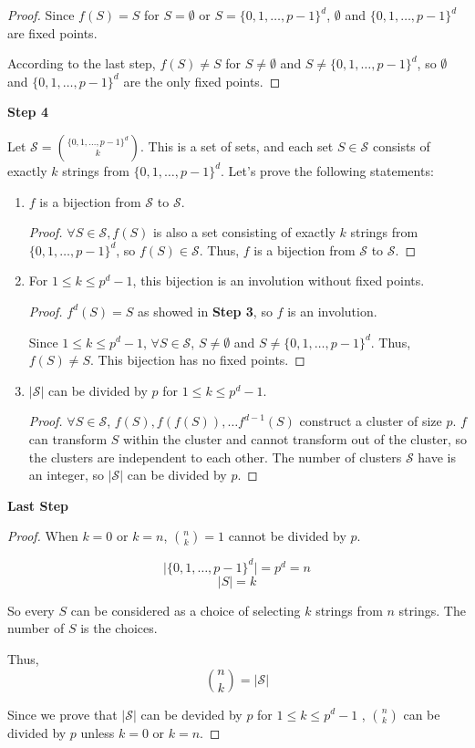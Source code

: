 \begin{solution}
\begin{proof}
Since $f(S) = S$ for $S = \emptyset$ or $S = \{0,1, \dots, p-1\}^d$, $\emptyset$ and $\{0,1, \dots, p-1\}^d$ are fixed points.

According to the last step, $f(S) \neq S$ for $S \neq \emptyset$ and $S \neq \{0,1, \dots, p-1 \}^d$, so $\emptyset$ and $\{0,1, \dots, p-1\}^d$ are the only fixed points.
\end{proof}

\textbf{Step 4}

Let $\mathcal{S} = { \{0,1, \dots, p-1\}^d \choose k }$. This is a set of sets, and each set $S \in \mathcal{S}$
consists of exactly $k$ strings from $\{0,1, \dots, p-1\}^d$. Let's prove the following statements: 
   \begin{enumerate}
   \item $f$ is a bijection from $\mathcal{S}$ to $\mathcal{S}$.
   \begin{proof}
   $\forall S \in \mathcal{S}, f(S)$ is also a set consisting of exactly $k$ strings from $\{0,1, \dots, p-1\}^d$, so $f(S) \in \mathcal{S}$. Thus, $f$ is a bijection from $\mathcal{S}$ to $\mathcal{S}$.
   \end{proof}
   \item For $1 \leq k \leq p^d-1$, this bijection is an involution without fixed points.
   \begin{proof}
   $f^d(S) = S$ as showed in \textbf{Step 3}, so $f$ is an involution.

   Since $1 \leq k \leq p^d - 1$, $\forall S \in \mathcal{S}$, $S \neq \emptyset$ and $S \neq \{0, 1, \dots, p-1\}^d$. Thus, $f(S) \neq S$. This bijection has no fixed points.

   \end{proof}
   \item $|\mathcal{S}|$ can be divided by $p$ for $1 \leq k \leq p^d - 1$.
   \begin{proof}
   $\forall S \in \mathcal{S}$, $f(S), f(f(S)), \dots f^{d-1}(S)$ construct a cluster of size $p$. $f$ can transform $S$ within the cluster and cannot transform out of the cluster, so the clusters are independent to each other. The number of clusters $\mathcal{S}$ have is an integer, so $\lvert \mathcal{S} \rvert$ can be divided by $p$.
   \end{proof}
   \end{enumerate}

   \textbf{Last Step}

\begin{proof}
When $k=0$ or $k=n$, ${n \choose k} = 1$ cannot be divided by $p$.

$$ \lvert \{0, 1, \dots, p-1\}^d \rvert = p^d = n $$
$$ \lvert S \rvert = k $$ 

So every $ S $ can be considered as a choice of selecting $k$ strings from $n$ strings. The number of $S$ is the choices.

Thus, $${n \choose k} = \lvert \mathcal{S} \rvert$$ 

Since we prove that $\lvert \mathcal{S} \rvert$ can be devided by $p$ for $1 \leq k \leq p^d - 1$ , ${n \choose k}$ can be divided by $p$ unless $k=0$ or $k=n$.
\end{proof}


\end{solution}
